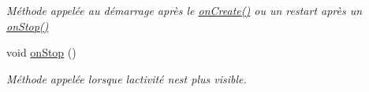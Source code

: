 \begin{DoxyCompactItemize}
\begin{DoxyCompactList}\small\item\em Méthode appelée au démarrage après le \hyperlink{classcom_1_1lasalle_1_1io__trucks_1_1_main_activity_a236d8585ed546ef42c0d2dfd3268893a}{on\+Create()} ou un restart après un \hyperlink{classcom_1_1lasalle_1_1io__trucks_1_1_main_activity_a6fbad98934d4b04260faff49da3d52ad}{on\+Stop()} \end{DoxyCompactList}\item 
void \hyperlink{classcom_1_1lasalle_1_1io__trucks_1_1_main_activity_a6fbad98934d4b04260faff49da3d52ad}{on\+Stop} ()
\begin{DoxyCompactList}\small\item\em Méthode appelée lorsque l\textquotesingle{}activité n\textquotesingle{}est plus visible. \end{DoxyCompactList}\end{DoxyCompactItemize}

